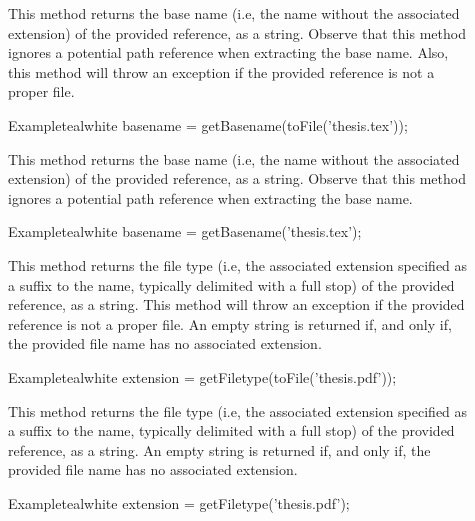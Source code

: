 \begin{description}
\item[] This method returns the base name (i.e, the name without the associated extension) of the provided  reference, as a string. Observe that this method ignores a potential path reference when extracting the base name. Also, this method will throw an exception if the provided reference is not a proper file.

\begin{codebox}{Example}{teal}{\icnote}{white}
basename = getBasename(toFile('thesis.tex'));
\end{codebox}

\item[] This method returns the base name (i.e, the name without the associated extension) of the provided  reference, as a string. Observe that this method ignores a potential path reference when extracting the base name.

\begin{codebox}{Example}{teal}{\icnote}{white}
basename = getBasename('thesis.tex');
\end{codebox}

\item[] This method returns the file type (i.e, the associated extension specified as a suffix to the name, typically delimited with a full stop) of the provided  reference, as a string. This method will throw an exception if the provided reference is not a proper file. An empty string is returned if, and only if, the provided file name has no associated extension.

\begin{codebox}{Example}{teal}{\icnote}{white}
extension = getFiletype(toFile('thesis.pdf'));
\end{codebox}

\item[] This method returns the file type (i.e, the associated extension specified as a suffix to the name, typically delimited with a full stop) of the provided  reference, as a string. An empty string is returned if, and only if, the provided file name has no associated extension.

\begin{codebox}{Example}{teal}{\icnote}{white}
extension = getFiletype('thesis.pdf');
\end{codebox}


\end{description}
